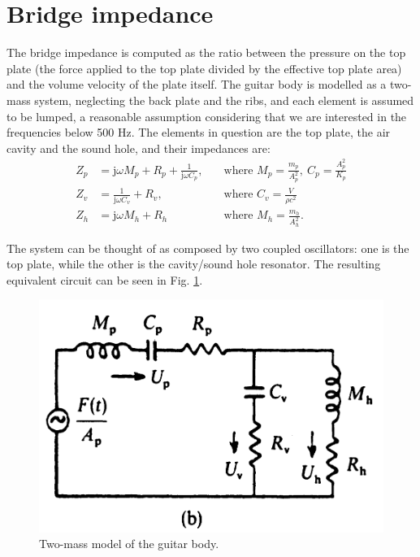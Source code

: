 \documentclass[a4paper]{article}
\begin{document}
\section{Bridge impedance}
The bridge impedance is computed as the ratio between the pressure on the top plate (the force applied to the top plate divided by the effective top plate area) and the volume velocity of the plate itself. The guitar body is modelled as a two-mass system, neglecting the back plate and the ribs, and each element is assumed to be lumped, a reasonable assumption considering that we are interested in the frequencies below 500 Hz. The elements in question are the top plate, the air cavity and the sound hole, and their impedances are:
\begin{align*}
	Z_p &= \mathrm{j}\omega M_p + R_p + \frac{1}{\mathrm{j}\omega C_p}, \quad &\text{where } M_p = \frac{m_p}{A_p^2}, ~ C_p = \frac{A_p^2}{K_p} \\
	Z_v &= \frac{1}{\mathrm{j}\omega C_v} + R_v, \quad &\text{where } C_v = \frac{V}{\rho c^2} \\
	Z_h &= \mathrm{j}\omega M_h + R_h \quad &\text{where } M_h = \frac{m_h}{A_h^2}.
\end{align*}

The system can be thought of as composed by two coupled oscillators: one is the top plate, while the other is the  cavity/sound hole resonator. The resulting equivalent circuit can be seen in Fig. \ref{fig:2mass}.


\begin{figure}
	\centering
	\includegraphics[width=\linewidth]{2mass.png}
	\caption{Two-mass model of the guitar body.}
	\label{fig:2mass}
\end{figure}
\end{document}
